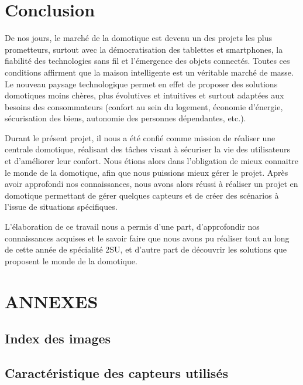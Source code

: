 \newpage
\chapter{Conclusion}
De nos jours, le marché de la domotique est devenu un des projets les plus prometteurs, surtout avec la démocratisation des tablettes et smartphones, la fiabilité des technologies sans fil et l'émergence des objets connectés. Toutes ces conditions affirment que la maison intelligente est un véritable marché de masse. Le nouveau paysage technologique permet en effet de proposer des solutions domotiques moins chères, plus évolutives et intuitives et surtout adaptées aux besoins des consommateurs (confort au sein du logement, économie d'énergie, sécurisation des biens, autonomie des personnes dépendantes, etc.).\newline

Durant le présent projet, il nous a été confié comme mission de réaliser une centrale domotique, réalisant des tâches visant à sécuriser la vie des utilisateurs et d'améliorer leur confort. Nous étions alors dans l'obligation de mieux connaitre le monde de la domotique, afin que nous puissions mieux gérer le projet.
Après avoir approfondi nos connaissances, nous avons alors réussi à réaliser un projet en domotique permettant de gérer quelques capteurs et de créer des scénarios à l'issue de situations spécifiques.\newline

L'élaboration de ce travail nous a permis d'une part, d'approfondir nos connaissances acquises et le savoir faire que nous avons pu réaliser tout au long de cette année de spécialité 2SU, et d'autre part de découvrir les solutions que proposent le monde de la domotique.\newline

\newpage
\chapter{ANNEXES}
\newpage
\section{Index des images}
\listoffigures
\newpage

\section{Caractéristique des capteurs utilisés}
